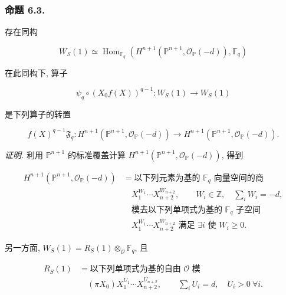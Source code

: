 \subsubsection*{命题 6.3.}
存在同构

\begin{equation}\tag{6.3.1}
W_S(1)\simeq
\operatorname{Hom}_{\mathbb F_q}\!\left(
H^{n+1}(\mathbb P^{n+1},\mathcal O_{\mathbb P}(-d)),
\mathbb F_q\right)
\end{equation}

在此同构下, 算子

\begin{equation}\tag{6.3.2}
\psi_q\circ(X_0f(X))^{q-1}:W_S(1)\longrightarrow W_S(1)
\end{equation}

是下列算子的转置

\begin{equation}\tag{6.3.3}
f(X)^{q-1}\mathfrak F_q:
H^{n+1}(\mathbb P^{n+1},\mathcal O_{\mathbb P}(-d))
\longrightarrow
H^{n+1}(\mathbb P^{n+1},\mathcal O_{\mathbb P}(-d)).
\end{equation}

\noindent\emph{证明.}
利用 $\mathbb P^{n+1}$ 的标准覆盖计算
$H^{n+1}(\mathbb P^{n+1},\mathcal O_{\mathbb P}(-d))$, 得到

\begin{equation}\tag{6.3.4}
\begin{aligned}
H^{n+1}(\mathbb P^{n+1},\mathcal O_{\mathbb P}(-d))
&=\text{以下列元素为基的 $\mathbb F_q$ 向量空间的商}\\
&\quad X_1^{W_1}\cdots X_{n+2}^{W_{n+2}},
\qquad W_i\in\mathbb Z,\quad\sum_iW_i=-d,\\
&\quad\text{模去以下列单项式为基的 $\mathbb F_q$ 子空间}\\
&\quad X_1^{W_1}\cdots X_{n+2}^{W_{n+2}}
\text{ 满足 }\exists i\text{ 使 }W_i\geq0.
\end{aligned}
\end{equation}

另一方面, $W_S(1)=R_S(1)\otimes_{\mathcal O}\mathbb F_q$, 且

\begin{equation}\tag{6.3.5}
\begin{aligned}
R_S(1)
&=\text{以下列单项式为基的自由 $\mathcal O$ 模}\\
&\quad
(\pi X_0)X_1^{U_1}\cdots X_{n+2}^{U_{n+2}},
\qquad
\sum_iU_i=d,\quad U_i>0\ \forall i.
\end{aligned}
\end{equation}


